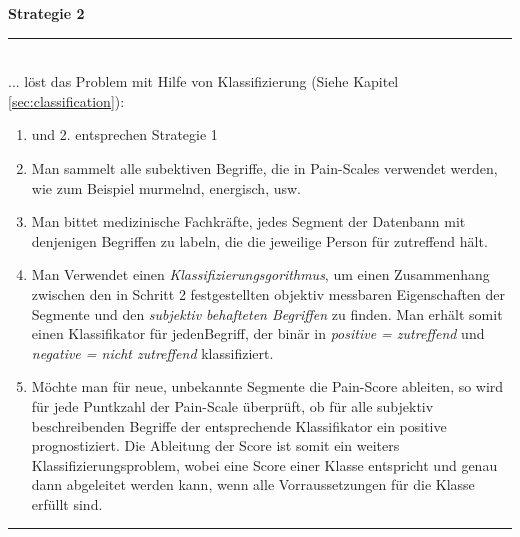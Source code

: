 \vspace{5mm}

\textbf{Strategie 2} \noindent\rule{0.83\linewidth}{0.3pt} \\
... löst das Problem mit Hilfe von Klassifizierung (Siehe Kapitel \ref{sec:classification}):
\begin{enumerate}
	\item und 2. entsprechen Strategie 1
	\item Man sammelt alle subektiven Begriffe, die in Pain-Scales verwendet werden, wie zum Beispiel \glqq murmelnd\grqq , \glqq energisch\grqq , usw.
	\item Man bittet medizinische Fachkräfte, jedes Segment der Datenbann mit denjenigen Begriffen zu labeln, die die jeweilige Person für zutreffend hält. 
	\item  Man Verwendet einen \emph{Klassifizierungsgorithmus}, um einen Zusammenhang zwischen den in Schritt 2 festgestellten objektiv messbaren Eigenschaften der Segmente und den \emph{subjektiv behafteten Begriffen} zu finden. Man erhält somit einen Klassifikator für jedenBegriff, der binär in \emph{positive = zutreffend} und \emph{negative = nicht zutreffend} klassifiziert.
	\item Möchte man für neue, unbekannte Segmente die Pain-Score ableiten, so wird für jede Puntkzahl der Pain-Scale überprüft, ob für alle subjektiv beschreibenden Begriffe der entsprechende Klassifikator ein positive prognostiziert. Die Ableitung der Score ist somit ein weiters Klassifizierungsproblem, wobei eine Score einer Klasse entspricht und genau dann abgeleitet werden kann, wenn alle Vorraussetzungen für die Klasse erfüllt sind.
\end{enumerate}
\noindent\rule{\linewidth}{0.3pt}

